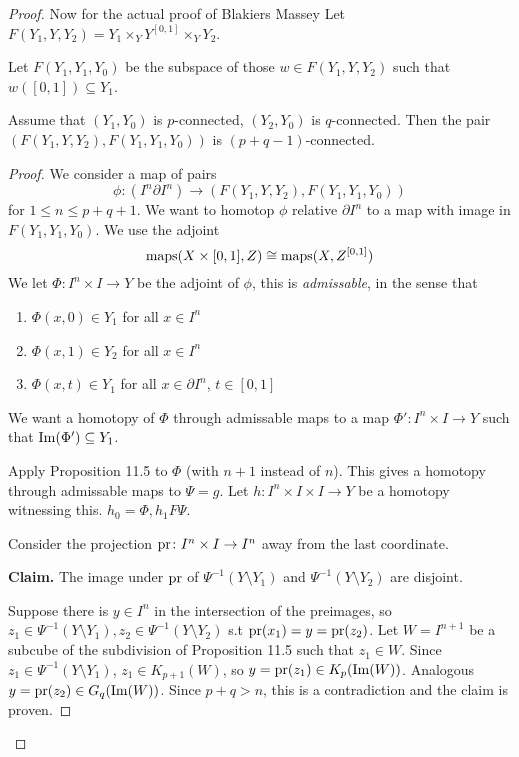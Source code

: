 \documentclass[language=english]{TemplateLecture}
\begin{document}
\begin{proof}

Now for the actual proof of Blakiers Massey
Let \(F(Y_1,Y, Y_2) = Y_1 \times_Y Y^{[0,1]} \times_Y Y_2\).

Let \(F(Y_1, Y_1, Y_0)\) be the subspace of those \(w \in F(Y_1, Y, Y_2)\) such that \(w([0,1])\subseteq Y_1\).

\begin{proposition}
    Assume that \((Y_1, Y_0)\) is \(p\)-connected, \((Y_2, Y_0)\) is \(q\)-connected. Then the pair \((F(Y_1, Y,Y_2), F(Y_1, Y_1, Y_0))\) is \((p+q-1)\)-connected.
\end{proposition}

\begin{proof}
    We consider a map of pairs
    \[\phi\colon (I^n \partial I^n) \to (F(Y_1, Y, Y_2), F(Y_1, Y_1, Y_0))\]
    for \(1 \leq n \leq p+q+1\). We want to homotop \(\phi\) relative \(\partial I^n\) to a map with image in \(F(Y_1, Y_1, Y_0)\). We use the adjoint
    \[\mathrm{maps}(X\times [0,1], Z) \cong \mathrm{maps}(X, Z^{[0,1]})\]
    We let \(\Phi\colon I^n \times I \to Y\) be the adjoint of \(\phi\), this is \emph{admissable}, in the sense that
    \begin{enumerate}
        \item \(\Phi(x, 0) \in Y_1\) for all \(x \in I^n\)
        \item \(\Phi(x,1) \in Y_2\) for all \(x \in I^n\)
        \item \(\Phi(x,t) \in Y_1\) for all \(x \in \partial I^n\), \(t \in [0,1]\)
    \end{enumerate}
    We want a homotopy of \(\Phi\) through admissable maps to a map \(\Phi' \colon I^n \times I \to Y\) such that \(\operatorname{Im}(\Phi')\subseteq Y_1\).

    Apply Proposition 11.5 to \(\Phi\) (with \(n+1\) instead of \(n\)). This gives a homotopy through admissable maps to \(\Psi = g\).
    Let \(h\colon I^n \times I \times I \to Y\) be a homotopy witnessing this. \(h_0 = \Phi, h_1 F \Psi\).

    Consider the projection \(\operatorname{pr}\colon I^n \times I\to I^n\) away from the last coordinate.

    \textbf{Claim.} The image under \(\operatorname{pr}\) of \(\Psi^{-1}(Y\setminus Y_1)\) and \(\Psi^{-1}(Y\setminus Y_2)\) are disjoint.

    Suppose there is \( y \in I^n\) in the intersection of the preimages, so \(z_1 \in \Psi^{-1}(Y\setminus Y_1), z_2 \in \Psi^{-1}(Y\setminus Y_2)\) s.t \(\operatorname{pr}(x_1) = y = \operatorname{pr}(z_2)\). Let \(W = I^{n+1}\) be a subcube of the subdivision of Proposition 11.5 such that \(z_1 \in W\). Since \(z_1 \in \Psi^{-1}(Y\setminus Y_1)\), \(z_1 \in K_{p+1}(W)\), so \(y = \operatorname{pr}(z_1) \in K_p(\operatorname{Im}(W))\). Analogous \(y = \operatorname{pr}(z_2) \in G_q(\operatorname{Im}(W))\). Since \(p+q > n\), this is a contradiction and the claim is proven.


\end{proof}
\end{proof}
\end{document}
